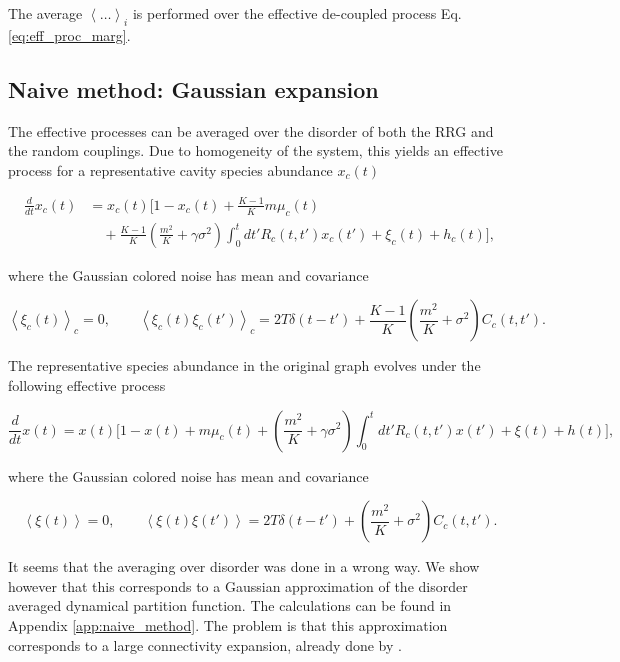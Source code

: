 \documentclass[
    preprint,
    linenumbers,
    amsmath,amssymb,amsfonts,
    aps, physrev,
    superscriptaddress,
    10pt,
    bibnotes
    ]{revtex4-2}
\begin{document}
The average $\left\langle \dots\right\rangle _{i}$ is performed over the effective de-coupled process Eq. \eqref{eq:eff_proc_marg}.


\subsection{Naive method: Gaussian expansion}

The effective processes can be averaged over the disorder of both the RRG and the random couplings. Due to homogeneity of the system, this yields an effective process for a representative cavity species
abundance $x_{c}(t)$

\begin{align}
\frac{d}{dt}x_{c}(t) & =x_{c}(t)\Biggl[1-x_{c}(t)+\frac{K-1}{K}m\mu_{c}(t)\nonumber \\
 & \quad+\frac{K-1}{K}\left(\frac{m^{2}}{K}+\gamma\sigma^{2}\right)\int_{0}^{t}dt'R_{c}(t,t')x_{c}(t')+\xi_{c}(t)+h_{c}(t)\Biggr],\label{eq:eff_proc_cav_RRG}
\end{align}

where the Gaussian colored noise has mean and covariance

\[
\left\langle \xi_{c}(t)\right\rangle _{c}=0,\qquad\left\langle \xi_{c}(t)\xi_{c}(t')\right\rangle _{c}=2T\delta(t-t')+\frac{K-1}{K}\left(\frac{m^{2}}{K}+\sigma^{2}\right)C_{c}(t,t').
\]

The representative species abundance in the original graph evolves
under the following effective process

\begin{equation}
\frac{d}{dt}x(t)=x(t)\Biggl[1-x(t)+m\mu_{c}(t)+\left(\frac{m^{2}}{K}+\gamma\sigma^{2}\right)\int_{0}^{t}dt'R_{c}(t,t')x(t')+\xi(t)+h(t)\Biggr],\label{eq:eff_proc_marg_RRG}
\end{equation}

where the Gaussian colored noise has mean and covariance

\begin{equation}
\left\langle \xi(t)\right\rangle =0,\qquad\left\langle \xi(t)\xi(t')\right\rangle =2T\delta(t-t')+\left(\frac{m^{2}}{K}+\sigma^{2}\right)C_{c}(t,t').
\end{equation}

It seems that the averaging over disorder was done in a wrong way.
We show however that this corresponds to a Gaussian approximation
of the disorder averaged dynamical partition function. The calculations
can be found in Appendix \ref{app:naive_method}. The problem is that this approximation corresponds to a large connectivity expansion, already done by \cite{aguirre-lopezHeterogeneousMeanfieldAnalysis2024}.
\end{document}
